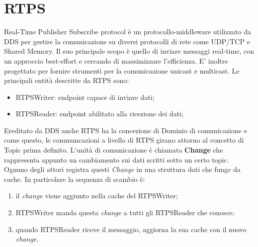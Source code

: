 \section{RTPS}
Real-Time Publisher Subscribe protocol è un protocollo-middleware utilizzato da DDS per gestire la comunicazione su diversi protocolli di rete come UDP/TCP e Shared Memory. Il suo principale scopo è quello di inviare messaggi real-time, con un approccio best-effort e cercando di massimizzare l'efficienza. E' inoltre progettato per fornire strumenti per la comunicazione unicast e multicast. Le principali entità descritte da RTPS sono:
\begin{itemize}
    \item RTPSWriter: endpoint capace di inviare dati;
    \item RTPSReader: endpoint abilitato alla ricezione dei dati;
\end{itemize}
Ereditato da DDS anche RTPS ha la concezione di Dominio di comunicazione e come questo, le communcazioni a livello di RTPS girano attorno al concetto di Topic prima definito. L'unità di comunicazione è chiamata \textbf{Change} che rappresenta appunto un cambiamento sui dati scritti sotto un certo topic. Ognuno degli attori registra questi \emph{Change} in una struttura dati che funge da cache.
In particolare la sequenza di scambio è:
\begin{enumerate}
    \item il \emph{change} viene aggiunto nella cache del RTPSWriter;
    \item RTPSWriter manda questa \emph{change} a tutti gli RTPSReader che conosce;
    \item quando RTPSReader riceve il messaggio, aggiorna la sua cache con il nuovo \emph{change}.
\end{enumerate}

